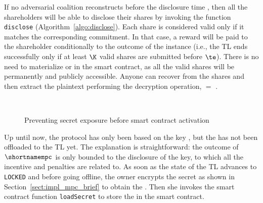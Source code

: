 If no adversarial coalition reconstructs \key before the disclosure time \td, then all the shareholders will be able to disclose their shares by invoking the function \texttt{disclose} (Algorithm~\ref{algo:disclose}).
Each share is considered valid only if it matches the corresponding commitment.
In that case, a reward will be paid to the shareholder conditionally to the outcome of the instance (i.e., the TL ends successfully only if at least $\K$ valid shares are submitted before $\te$).
There is no need to materialize \key or \secret in the smart contract, as all the valid shares will be permanently and publicly accessible. Anyone can recover \key from the shares and then extract the plaintext performing the decryption operation, \secret $=$ \unwrap.

\begin{figure}[t]
	\centering
	\\
	\vspace*{2pt}
	\caption{Preventing secret exposure before smart contract activation}%
	\label{fig:key_delayed_wrap}%
\end{figure}


Up until now, the protocol has only been based on the key \key, but the \secret has not been offloaded to the TL yet.
The explanation is straightforward: the outcome of $\shortnamempc$ is only bounded to the disclosure of the key, to which all the incentive and penalties are related to. 
As soon as the state of the TL advances to \texttt{LOCKED} and before going offline, the owner encrypts the secret \secret as shown in Section~\ref{sect:impl_mpc_brief} to obtain the \ciphertext. Then she invokes the smart contract function \texttt{loadSecret} to store the \ciphertext in the smart contract.